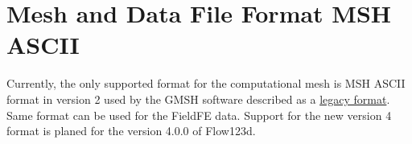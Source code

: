 %
%
%
%


\section{Mesh and Data File Format MSH ASCII}
\label{mesh_file}

Currently, the only supported format for the computational mesh is MSH ASCII format in version 2 used
by the GMSH software described as a 
\href{http://gmsh.info//doc/texinfo/gmsh.html#MSH-file-format-version-2-_0028Legacy_0029}{legacy format}.
Same format can be used for the FieldFE data. Support for the new version 4 format is planed for the version 4.0.0 of Flow123d.

